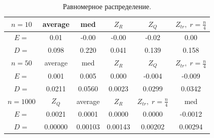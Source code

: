 \documentclass[a4]{article}
\begin{document}
			\begin{table}[h]
				\caption{ Равномерное распределение.}
				\begin{center}
					\begin{tabular}{|c|c|c|c|c|c|}
						\hline
						$n = 10$  & average & med & $Z_R$ & $Z_Q$ & $Z_{tr},\;r=\frac{n}{4}$\\ \hline
						$E =$       &	0.01  &       -0.00 &       -0.00       & -0.02      &  0.00\\ \hline  
						$D =$       &	0.098     &    0.220 &        0.041      &   0.139       &  0.158  \\ \hline
						
						$n = 50$  & average & med & $Z_R$ & $Z_Q$ & $Z_{tr},\;r=\frac{n}{4}$\\ \hline
						$E =$       & 0.001 &        0.005      &   0.000     &    -0.004 &       -0.009    \\ \hline
						$D =$       &	0.0211      &   0.0560  &       0.0023      &   0.0299       &  0.0342\\ \hline
						
						$n = 1000$ & $Z_Q$ & average  & $Z_R$  & $Z_{tr},\;r=\frac{n}{4}$& med\\ \hline
						$E =$   &  0.0021  &  	0.0001     &        0.0000              &  0.0000&     -0.0012\\ \hline
						$D =$   &     0.00000 &   	0.00103                &   0.00143       &  0.00202 &   0.00294 \\
						\hline
					\end{tabular}
				\end{center}
			\end{table}
			\newpage
\end{document}
